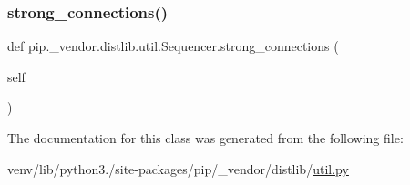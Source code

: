\subsubsection{\texorpdfstring{strong\+\_\+connections()}{strong\_connections()}}
{\footnotesize\ttfamily def pip.\+\_\+vendor.\+distlib.\+util.\+Sequencer.\+strong\+\_\+connections (\begin{DoxyParamCaption}\item[{}]{self }\end{DoxyParamCaption})}



The documentation for this class was generated from the following file\+:\begin{DoxyCompactItemize}
\item 
venv/lib/python3./site-\/packages/pip/\+\_\+vendor/distlib/\hyperlink{pip_2__vendor_2distlib_2util_8py}{util.\+py}\end{DoxyCompactItemize}
